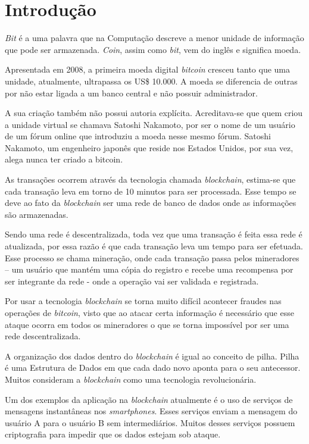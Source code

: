 \documentclass[12pt]{article}
\begin{document}
\section{Introdução}

\textit{Bit} é a uma palavra que na Computação descreve a menor unidade de informação que pode ser armazenada. \textit{Coin}, assim como \textit{bit}, vem do inglês e significa moeda.

Apresentada em 2008, a primeira moeda digital \textit{bitcoin} cresceu tanto que uma unidade, atualmente, ultrapassa os US\$ 10.000. A moeda se diferencia de outras por não estar ligada a um banco central e não possuir administrador.

A sua criação também não possui autoria explícita. Acreditava-se que quem criou a unidade virtual se chamava Satoshi Nakamoto, por ser o nome de um usuário de um fórum online que introduziu a moeda nesse mesmo fórum. Satoshi Nakamoto, um engenheiro japonês que reside nos Estados Unidos, por sua vez, alega nunca ter criado a bitcoin.

As transações ocorrem através da tecnologia chamada \textit{blockchain}, estima-se que cada transação leva em torno de 10 minutos para ser processada. Esse tempo se deve ao fato da \textit{blockchain} ser uma rede de banco de dados onde as informações são armazenadas. 

Sendo uma rede é descentralizada, toda vez que uma transação é feita essa rede é atualizada, por essa razão é que cada transação leva um tempo para ser efetuada. Esse processo se chama mineração, onde cada transação passa pelos mineradores – um usuário que mantém uma cópia do registro e recebe uma recompensa por ser integrante da rede - onde a operação vai ser validada e registrada.

Por usar a tecnologia \textit{blockchain} se torna muito difícil acontecer fraudes nas operações de \textit{bitcoin}, visto que ao atacar certa informação é necessário que esse ataque ocorra em todos os mineradores o que se torna impossível por ser uma rede descentralizada.

A organização dos dados dentro do \textit{blockchain} é igual ao conceito de pilha. Pilha é uma Estrutura de Dados em que cada dado novo aponta para o seu antecessor. Muitos consideram a \textit{blockchain} como uma tecnologia revolucionária. 

Um dos exemplos da aplicação na \textit{blockchain} atualmente é o uso de serviços de mensagens instantâneas nos \textit{smartphones}. Esses serviços enviam a mensagem do usuário A para o usuário B sem intermediários. Muitos desses serviços possuem criptografia para impedir que os dados estejam sob ataque.
\end{document}
